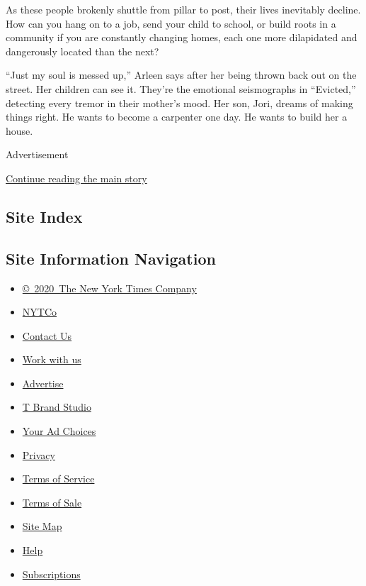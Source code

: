 As these people brokenly shuttle from pillar to post, their lives
inevitably decline. How can you hang on to a job, send your child to
school, or build roots in a community if you are constantly changing
homes, each one more dilapidated and dangerously located than the next?

``Just my soul is messed up,'' Arleen says after her being thrown back
out on the street. Her children can see it. They're the emotional
seismographs in ``Evicted,'' detecting every tremor in their mother's
mood. Her son, Jori, dreams of making things right. He wants to become a
carpenter one day. He wants to build her a house.

Advertisement

\protect\hyperlink{after-bottom}{Continue reading the main story}

\hypertarget{site-index}{%
\subsection{Site Index}\label{site-index}}

\hypertarget{site-information-navigation}{%
\subsection{Site Information
Navigation}\label{site-information-navigation}}

\begin{itemize}
\tightlist
\item
  \href{https://help.nytimes3xbfgragh.onion/hc/en-us/articles/115014792127-Copyright-notice}{©~2020~The
  New York Times Company}
\end{itemize}

\begin{itemize}
\tightlist
\item
  \href{https://www.nytco.com/}{NYTCo}
\item
  \href{https://help.nytimes3xbfgragh.onion/hc/en-us/articles/115015385887-Contact-Us}{Contact
  Us}
\item
  \href{https://www.nytco.com/careers/}{Work with us}
\item
  \href{https://nytmediakit.com/}{Advertise}
\item
  \href{http://www.tbrandstudio.com/}{T Brand Studio}
\item
  \href{https://www.nytimes3xbfgragh.onion/privacy/cookie-policy\#how-do-i-manage-trackers}{Your
  Ad Choices}
\item
  \href{https://www.nytimes3xbfgragh.onion/privacy}{Privacy}
\item
  \href{https://help.nytimes3xbfgragh.onion/hc/en-us/articles/115014893428-Terms-of-service}{Terms
  of Service}
\item
  \href{https://help.nytimes3xbfgragh.onion/hc/en-us/articles/115014893968-Terms-of-sale}{Terms
  of Sale}
\item
  \href{https://spiderbites.nytimes3xbfgragh.onion}{Site Map}
\item
  \href{https://help.nytimes3xbfgragh.onion/hc/en-us}{Help}
\item
  \href{https://www.nytimes3xbfgragh.onion/subscription?campaignId=37WXW}{Subscriptions}
\end{itemize}
